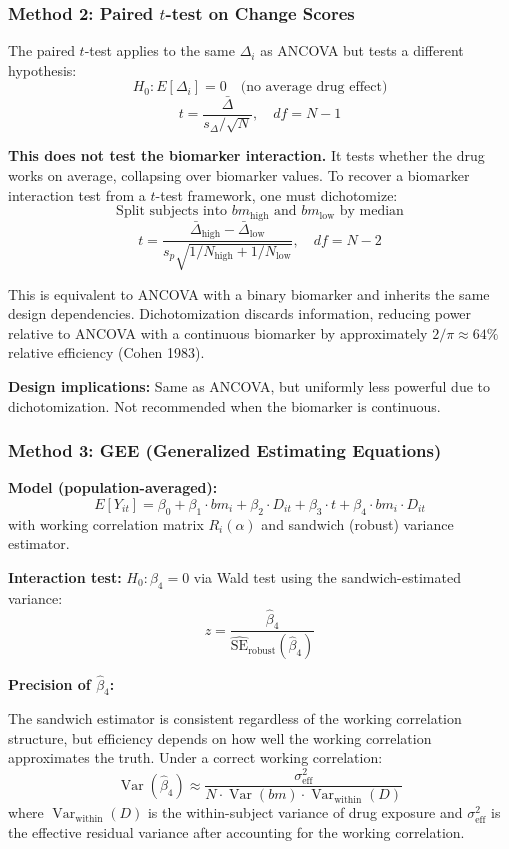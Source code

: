 \documentclass[11pt]{article}
\begin{document}
\subsubsection{Method 2: Paired $t$-test on Change Scores}

The paired $t$-test applies to the same $\Delta_i$ as ANCOVA but tests
a different hypothesis:
\[
H_0: E[\Delta_i] = 0 \quad \text{(no average drug effect)}
\]
\[
t = \frac{\bar{\Delta}}{s_\Delta / \sqrt{N}}, \quad df = N - 1
\]

\textbf{This does not test the biomarker interaction.} It tests whether
the drug works on average, collapsing over biomarker values. To recover
a biomarker interaction test from a $t$-test framework, one must
dichotomize:
\[
\text{Split subjects into } bm_{\text{high}} \text{ and }
bm_{\text{low}} \text{ by median}
\]
\[
t = \frac{\bar{\Delta}_{\text{high}} -
\bar{\Delta}_{\text{low}}}{s_p \sqrt{1/N_{\text{high}} +
1/N_{\text{low}}}}, \quad df = N - 2
\]

This is equivalent to ANCOVA with a binary biomarker and inherits the
same design dependencies. Dichotomization discards information, reducing
power relative to ANCOVA with a continuous biomarker by approximately
$2/\pi \approx 64\%$ relative efficiency (Cohen 1983).

\textbf{Design implications:} Same as ANCOVA, but uniformly less
powerful due to dichotomization. Not recommended when the biomarker is
continuous.

\subsubsection{Method 3: GEE (Generalized Estimating Equations)}

\textbf{Model (population-averaged):}
\[
E[Y_{it}] = \beta_0 + \beta_1 \cdot bm_i + \beta_2 \cdot D_{it}
+ \beta_3 \cdot t + \beta_4 \cdot bm_i \cdot D_{it}
\]
with working correlation matrix $R_i(\alpha)$ and sandwich (robust)
variance estimator.

\textbf{Interaction test:} $H_0: \beta_4 = 0$ via Wald test using the
sandwich-estimated variance:
\[
z = \frac{\hat{\beta}_4}{\widehat{\text{SE}}_{\text{robust}}
(\hat{\beta}_4)}
\]

\textbf{Precision of $\hat{\beta}_4$:}

The sandwich estimator is consistent regardless of the working
correlation structure, but efficiency depends on how well the working
correlation approximates the truth. Under a correct working correlation:
\[
\operatorname{Var}(\hat{\beta}_4) \approx
\frac{\sigma^2_{\text{eff}}}{N \cdot \operatorname{Var}(bm) \cdot
\operatorname{Var}_{\text{within}}(D)}
\]
where $\operatorname{Var}_{\text{within}}(D)$ is the within-subject
variance of drug exposure and $\sigma^2_{\text{eff}}$ is the effective
residual variance after accounting for the working correlation.
\end{document}
